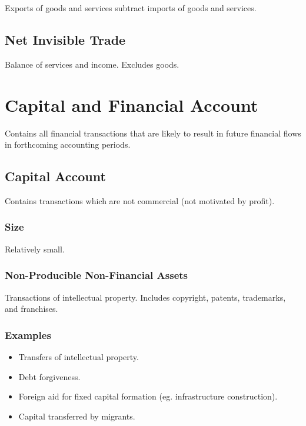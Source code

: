 \documentclass[a4paper,11pt]{article}
\begin{document}
Exports of goods and services subtract imports of goods and services.


\subsection{Net Invisible Trade}

Balance of services and income. Excludes goods.




\section{Capital and Financial Account}

Contains all financial transactions that are likely to result in future
financial flows in forthcoming accounting periods.


\subsection{Capital Account}

Contains transactions which are not commercial (not motivated by profit).


\subsubsection{Size}

Relatively small.


\subsubsection{Non-Producible Non-Financial Assets}

Transactions of intellectual property. Includes copyright, patents, trademarks,
and franchises.


\subsubsection{Examples}

\begin{itemize}
\item Transfers of intellectual property.
\item Debt forgiveness.
\item Foreign aid for fixed capital formation (eg. infrastructure construction).
\item Capital transferred by migrants.
\end{itemize}
\end{document}
